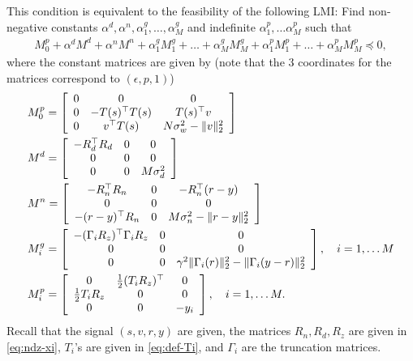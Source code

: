 \documentclass[11pt, onecolumn]{article}
\begin{document}
This condition is  equivalent to the  feasibility of the following LMI:
Find non-negative constants $\alpha^d, \alpha^n,\alpha^g_1,\dots, \alpha^g_M$ and indefinite $\alpha^p_1,\dots
\alpha^p_M$ such that
\begin{align*}
  M_0^p +  \alpha^d M^d + \alpha^n M^n  + \alpha^g_1 M^g_1
  + \dots+ \alpha^g_M M^g_M   + \alpha^p_1 M^p_1 +\dots + \alpha^p_M M^p_M \preceq 0,
\end{align*}
where the constant matrices are given by (note that the 3 coordinates for the matrices correspond to $(\epsilon, p, 1)$)
\begin{align*}
  & M^p_0 = \left[ \begin{array}[c]{ccc} 0 &0&0 \\ 0 & -T(s)^\top T(s)& T(s)^\top v \\ 0& v^\top T(s)
    & N\sigma_w^2 - \|v\|_2^2 \end{array} \right]
  \\
  & M^d = \left[ \begin{array}[c]{ccc} -R_d^\top R_d &0 & 0 \\ 0 & 0 & 0 \\ 0&0&
    M\sigma_d^2 \end{array} \right]
  \\
  & M^n = \left[ \begin{array}[c]{ccc} -R_n^\top R_n &0& -R_n^\top(r-y) \\ 0 & 0& 0 \\ -(r-y)^\top
    R_n& 0 & M\sigma_n^2 - \|r-y\|_2^2 \end{array} \right]
  \\
  & M^g_i = \left[ \begin{array}[c]{ccc} - (\Gamma_{i}R_z)^\top \Gamma_{i}R_z &0 & 0 \\ 0 & 0 & 0 \\
    0&0& \gamma^2 \|\Gamma_{i}(r)\|_2^2 - \|\Gamma_{i}(y-r)\|_2^2 \end{array} \right], \quad i = 1,\dots M
  \\
  & M^p_i = \left[ \begin{array}[c]{ccc} 0 &{1\over 2}(T_iR_z)^\top & 0 \\ {1\over 2} T_iR_z & 0 & 0
    \\ 0&0& -y_i \end{array} \right], \quad i = 1,\dots M.
\end{align*}
Recall that the signal $(s,v, r, y)$ are given, the matrices $R_n, R_d,R_z$ are given in
\eqref{eq:ndz-xi}, $T_i$'s are given in \eqref{eq:def-Ti}, and $\Gamma_i$ are the truncation
matrices.
\end{document}
